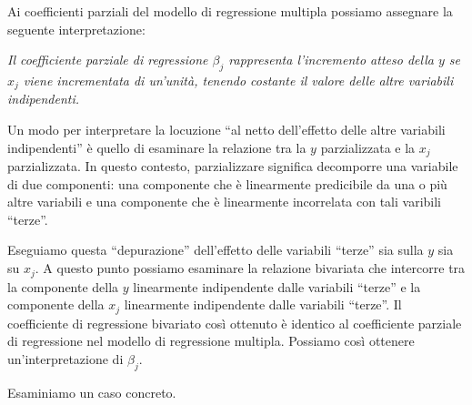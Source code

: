 \documentclass[
  11pt,
]{krantz}
\makeatletter
\newenvironment{Shaded}{\begin{snugshade}}{\end{snugshade}}
\newcommand{\CommentTok}[1]{\textcolor[rgb]{0.37,0.37,0.37}{\textit{#1}}}
\newcommand{\FunctionTok}[1]{\textcolor[rgb]{0,0,0}{#1}}
\newcommand{\NormalTok}[1]{#1}
\newcommand{\OtherTok}[1]{\textcolor[rgb]{0.37,0.37,0.37}{#1}}
\newcommand{\SpecialCharTok}[1]{\textcolor[rgb]{0,0,0}{#1}}
\newcommand{\StringTok}[1]{\textcolor[rgb]{0.5,0.5,0.5}{#1}}
\newenvironment{kframe}{%
\medskip{}
\setlength{\fboxsep}{.8em}
 \def\at@end@of@kframe{}%
 \ifinner\ifhmode%
  \def\at@end@of@kframe{\end{minipage}}%
  \begin{minipage}{\columnwidth}%
 \fi\fi%
 \def\FrameCommand##1{\hskip\@totalleftmargin \hskip-\fboxsep
 \colorbox{shadecolor}{##1}\hskip-\fboxsep
     \hskip-\linewidth \hskip-\@totalleftmargin \hskip\columnwidth}%
 \MakeFramed {\advance\hsize-\width
   \@totalleftmargin\z@ \linewidth\hsize
   \@setminipage}}%
 {\par\unskip\endMakeFramed%
 \at@end@of@kframe}
\renewenvironment{Shaded}{\begin{kframe}}{\end{kframe}}
\makeatother
\begin{document}
Ai coefficienti parziali del modello di regressione multipla possiamo assegnare la seguente interpretazione:

\emph{Il coefficiente parziale di regressione \(\beta_j\) rappresenta l'incremento atteso della \(y\) se \(x_j\) viene incrementata di un'unità, tenendo costante il valore delle altre variabili indipendenti.}

Un modo per interpretare la locuzione ``al netto dell'effetto delle altre variabili indipendenti'' è quello di esaminare la relazione tra la \(y\) parzializzata e la \(x_j\) parzializzata. In questo contesto, parzializzare significa decomporre una variabile di due componenti: una componente che è linearmente predicibile da una o più altre variabili e una componente che è linearmente incorrelata con tali varibili ``terze''.

Eseguiamo questa ``depurazione'' dell'effetto delle variabili ``terze'' sia sulla \(y\) sia su \(x_j\). A questo punto possiamo esaminare la relazione bivariata che intercorre tra la componente della \(y\) linearmente indipendente dalle variabili ``terze'' e la componente della \(x_j\) linearmente indipendente dalle variabili ``terze''. Il coefficiente di regressione bivariato così ottenuto è identico al coefficiente parziale di regressione nel modello di regressione multipla. Possiamo così ottenere un'interpretazione di \(\beta_j\).

Esaminiamo un caso concreto.

\begin{Shaded}
\end{Shaded}
\end{document}
